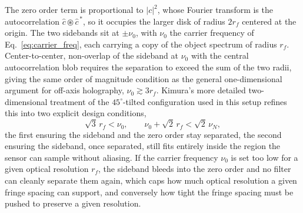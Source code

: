 The zero order term is proportional to $|c|^2$, whose Fourier transform is the autocorrelation $\hat{c}\circledast\hat{c}^{\,*}$, so it occupies the larger disk of radius $2r_f$ centered at the origin. The two sidebands sit at $\pm\nu_0$, with $\nu_0$ the carrier frequency of Eq.~\eqref{eq:carrier_freq}, each carrying a copy of the object spectrum of radius $r_f$. Center-to-center, non-overlap of the sideband at $\nu_0$ with the central autocorrelation blob requires the separation to exceed the sum of the two radii, giving the same order of magnitude condition as the general one-dimensional argument for off-axis holography, $\nu_0 \gtrsim 3r_f$. Kimura's more detailed two-dimensional treatment of the $45^{\circ}$-tilted configuration used in this setup refines this into two explicit design conditions,
\begin{equation}
\sqrt{3}\,r_f < \nu_0, \qquad \nu_0+\sqrt{2}\,r_f < \sqrt{2}\,\nu_N,
\end{equation}
the first ensuring the sideband and the zero order stay separated, the second ensuring the sideband, once separated, still fits entirely inside the region the sensor can sample without aliasing. If the carrier frequency $\nu_0$ is set too low for a given optical resolution $r_f$, the sideband bleeds into the zero order and no filter can cleanly separate them again, which caps how much optical resolution a given fringe spacing can support, and conversely how tight the fringe spacing must be pushed to preserve a given resolution.


